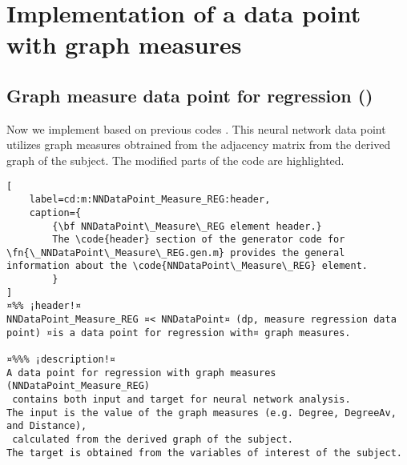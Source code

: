 \documentclass{tufte-handout}
\begin{document}
\clearpage

\section{Implementation of a data point with graph measures}

\subsection{Graph measure data point for regression ()}

Now we implement  based on previous codes .
This neural network data point utilizes graph measures obtrained from the adjacency matrix from the derived graph of the subject. 
The modified parts of the code are highlighted.

\begin{lstlisting}[
	label=cd:m:NNDataPoint_Measure_REG:header,
	caption={
		{\bf NNDataPoint\_Measure\_REG element header.}
		The \code{header} section of the generator code for \fn{\_NNDataPoint\_Measure\_REG.gen.m} provides the general information about the \code{NNDataPoint\_Measure\_REG} element.
		}
]
¤%% ¡header!¤
NNDataPoint_Measure_REG ¤< NNDataPoint¤ (dp, measure regression data point) ¤is a data point for regression with¤ graph measures.

¤%%% ¡description!¤
A data point for regression with graph measures (NNDataPoint_Measure_REG) 
 contains both input and target for neural network analysis.
The input is the value of the graph measures (e.g. Degree, DegreeAv, and Distance), 
 calculated from the derived graph of the subject.
The target is obtained from the variables of interest of the subject.
\end{lstlisting}
\end{document}
